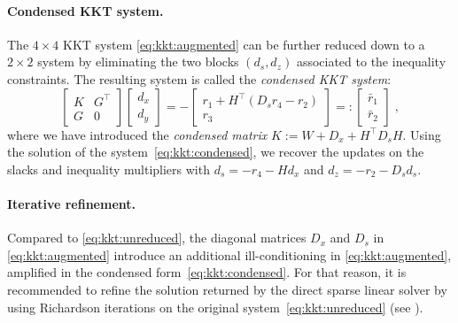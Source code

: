 \paragraph{Condensed KKT system.}
The $4 \times 4$ KKT system \eqref{eq:kkt:augmented} can be further
reduced down to a $2 \times 2$ system by eliminating the two blocks
$(d_s, d_z)$ associated to the inequality constraints.
The resulting system is called the \emph{condensed KKT system}:
\begin{equation}
  \label{eq:kkt:condensed}
  \tag{$K_1$}
  \begin{bmatrix}
    K & G^\top \\
    G & 0
  \end{bmatrix}
  \begin{bmatrix}
    d_x \\ d_y
  \end{bmatrix}
  =
  -
  \begin{bmatrix}
    r_1 + H^\top(D_s r_4 - r_2) \\ r_3
  \end{bmatrix}
  =:
  \begin{bmatrix}
    \bar{r}_1 \\ \bar{r}_2
  \end{bmatrix}
   \; ,
\end{equation}
where we have introduced the \emph{condensed matrix} $K := W + D_x + H^\top D_s H$.
Using the solution of the system~\eqref{eq:kkt:condensed},
we recover the updates on the slacks and inequality multipliers with
$d_s = -r_4 - Hd_x$ and $d_z = -r_2 - D_s d_s$.


\paragraph{Iterative refinement.}

Compared to \eqref{eq:kkt:unreduced},
the diagonal matrices $D_x$ and $D_s$ in \eqref{eq:kkt:augmented} introduce
an additional ill-conditioning in \eqref{eq:kkt:augmented}, amplified
in the condensed form~\eqref{eq:kkt:condensed}. For that reason, it
is recommended to refine the solution returned by the direct sparse linear
solver by using Richardson iterations on the original system~\eqref{eq:kkt:unreduced}
(see \cite[Section 3.10]{wachter2006implementation}).

